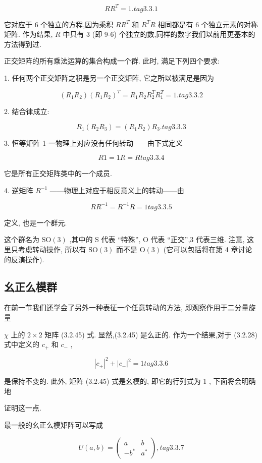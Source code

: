 $$
R{R}^{T} = 1\text{.} tag{3. 3.1}
$$

它对应于 6 个独立的方程,因为乘积 $R{R}^{T}$ 和 ${R}^{T}R$ 相同都是有 6 个独立元素的对称矩阵. 作为结果, $R$ 中只有 3 (即 9-6) 个独立的数,同样的数字我们以前用更基本的方法得到过.

正交矩阵的所有乘法运算的集合构成一个群. 此时, 满足下列四个要求:

1. 任何两个正交矩阵之积是另一个正交矩阵, 它之所以被满足是因为

$$
\left( {{R}_{1}{R}_{2}}\right) {\left( {R}_{1}{R}_{2}\right) }^{T} = {R}_{1}{R}_{2}{R}_{2}^{T}{R}_{1}^{T} = 1. tag{3. 3.2}
$$

2. 结合律成立:

$$
{R}_{1}\left( {{R}_{2}{R}_{3}}\right) = \left( {{R}_{1}{R}_{2}}\right) {R}_{3}. tag{3.3.3}
$$

3. 恒等矩阵 1-一物理上对应没有任何转动——由下式定义

$$
{R1} = {1R} = R tag{3.3.4}
$$

它是所有正交矩阵类中的一个成员.

4. 逆矩阵 ${R}^{-1}$ ——物理上对应于相反意义上的转动——由

$$
R{R}^{-1} = {R}^{-1}R = 1 tag{3.3.5}
$$

定义, 也是一个群元.

这个群名为 $\mathrm{{SO}}\left( 3\right)$ ,其中的 $\mathrm{S}$ 代表 “特殊”, $\mathrm{O}$ 代表 “正交”,3 代表三维. 注意, 这里只考虑转动操作, 所以有 $\mathrm{{SO}}\left( 3\right)$ 而不是 $\mathrm{O}\left( 3\right)$ (它可以包括将在第 4 章讨论的反演操作).

\subsection{幺正么模群}

在前一节我们还学会了另外一种表征一个任意转动的方法, 即观察作用于二分量旋量

$\chi$ 上的 $2 \times 2$ 矩阵 (3.2.45) 式. 显然,(3.2.45) 是么正的. 作为一个结果,对于 (3.2.28) 式中定义的 ${c}_{ + }$ 和 ${c}_{ - }$ ,

$$
{\left| {c}_{ + }\right| }^{2} + {\left| {c}_{ - }\right| }^{2} = 1 tag{3. 3.6}
$$

是保持不变的. 此外, 矩阵 (3.2.45) 式是幺模的, 即它的行列式为 1 , 下面将会明确地

证明这一点.

最一般的幺正么模矩阵可以写成

$$
U\left( {a, b}\right) = \left( \begin{matrix} a & b \\ - {b}^{ * } & {a}^{ * } \end{matrix}\right) , tag{3.3.7}
$$

